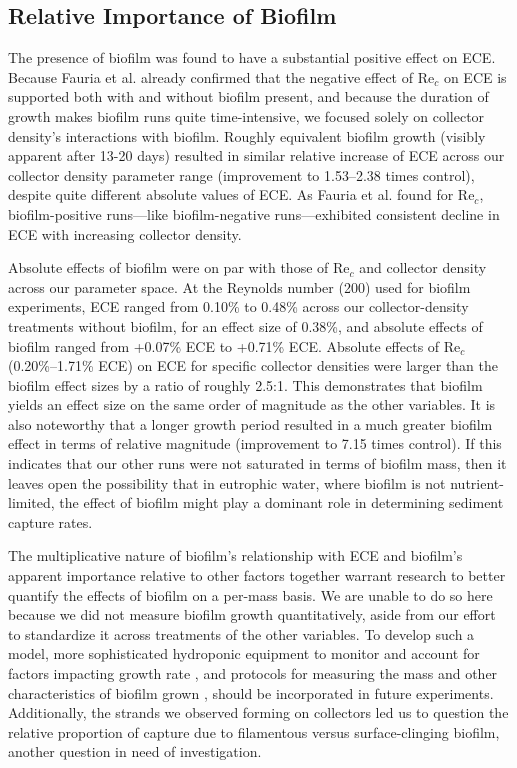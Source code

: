 \documentclass[geosciences,article,submit,moreauthors,pdftex]{Definitions/mdpi}
\newcommand\Rey{\mathrm{Re}}
\begin{document}
\subsection{Relative Importance of Biofilm}

The presence of biofilm was found to have a substantial positive effect on ECE. Because Fauria et al. \cite{Fauria_2015} already confirmed that the negative effect of $\Rey_c$ on ECE is supported both with and without biofilm present, and because the duration of growth makes biofilm runs quite time-intensive, we focused solely on collector density's interactions with biofilm. Roughly equivalent biofilm growth (visibly apparent after 13-20 days) resulted in similar relative increase of ECE across our collector density parameter range (improvement to 1.53--2.38 times control), despite quite different absolute values of ECE. As Fauria et al. \cite{Fauria_2015} found for $\Rey_c$, biofilm-positive runs---like biofilm-negative runs---exhibited consistent decline in ECE with increasing collector density.

Absolute effects of biofilm were on par with those of $\Rey_c$ and collector density across our parameter space. At the Reynolds number (200) used for biofilm experiments, ECE ranged from 0.10\% to 0.48\% across our collector-density treatments without biofilm, for an effect size of 0.38\%, and absolute effects of biofilm ranged from +0.07\% ECE to +0.71\% ECE. Absolute effects of $\Rey_c$ (0.20\%--1.71\% ECE) on ECE for specific collector densities were larger than the biofilm effect sizes by a ratio of roughly 2.5:1. This demonstrates that biofilm yields an effect size on the same order of magnitude as the other variables. It is also noteworthy that a longer growth period resulted in a much greater biofilm effect in terms of relative magnitude (improvement to 7.15 times control). If this indicates that our other runs were not saturated in terms of biofilm mass, then it leaves open the possibility that in eutrophic water, where biofilm is not nutrient-limited, the effect of biofilm might play a dominant role in determining sediment capture rates.

The multiplicative nature of biofilm's relationship with ECE and biofilm's apparent importance relative to other factors together warrant research to better quantify the effects of biofilm on a per-mass basis. We are unable to do so here because we did not measure biofilm growth quantitatively, aside from our effort to standardize it across treatments of the other variables. To develop such a model, more sophisticated hydroponic equipment to monitor and account for factors impacting growth rate \cite{schnurr2014effect, trulear1982dynamics}, and protocols for measuring the mass and other characteristics of biofilm grown \cite{liu1994simple,characklis1982dynamics}, should be incorporated in future experiments. Additionally, the strands we observed forming on collectors led us to question the relative proportion of capture due to filamentous versus surface-clinging biofilm, another question in need of investigation.
\end{document}
